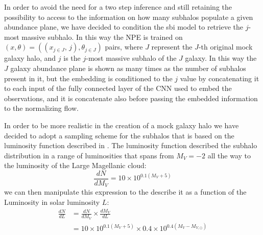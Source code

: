 In order to avoid the need for a two step inference and still retaining the possibility to access to the information on how many subhalos populate a given abundance plane, we have decided to condition the sbi model to retrieve the $j$-most massive subhalo. In this way the NPE is trained on $(x, \theta) = ((x_{j \in J}, \, j), \theta_{j \in J})$ pairs, where $J$ represent the $J$-th original mock galaxy halo, and $j$ is the  $j$-most massive subhalo of the $J$ galaxy. In this way the $J$ galaxy abundance plane is shown as many times as the number of subhalos present in it, but the embedding is conditioned to the $j$ value by concatenating it to each input of the fully connected layer of the CNN used to embed the observations, and it is concatenate also before passing the embedded information to the normalizing flow. 

In order to be more realistic in the creation of a mock galaxy halo we have decided to adopt a sampling scheme for the subhalos that is based on the luminosity function described in \cite{koposovLuminosityFunctionMilky2008}. The luminosity function described the subhalo distribution in a range of luminosities that spans from $M_V = -2$ all the way to the luminosity of the Large Magellanic cloud:
\begin{equation}
    \frac{dN}{d M_V} = 10 \times 10^{0.1(M_V + 5)} 
\end{equation}
we can then manipulate this expression to the describe it as a function of the Luminosity in solar luminosity $L$:
\begin{equation}
\begin{split}
    \frac{dN}{dL} &= \frac{dN}{d M_V} \times \frac{dM_V}{dL} \\
    &= 10 \times 10^{0.1(M_V + 5)} \times 0.4 \times 10^{0.4(M_V - M_{V, \odot})} \\
\end{split}
\end{equation}

